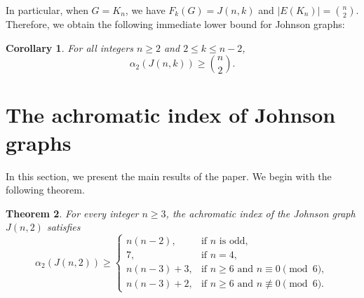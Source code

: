 \documentclass{article}
\newtheorem{theorem}{Theorem}[section]
\newtheorem{corollary}[theorem]{Corollary}
\begin{document}
In particular, when $ G = K_n $, we have $ F_k(G) = J(n,k) $ and $ |E(K_n)| = \binom{n}{2} $. Therefore, we obtain the following immediate lower bound for Johnson graphs:

\begin{corollary}
For all integers $ n \geq 2 $ and $ 2 \leq k \leq n-2 $,
$$
\alpha_2(J(n,k)) \geq \binom{n}{2}.
$$
\end{corollary}







\section{The achromatic index of Johnson graphs}
\label{sect:results}

In this section, we present the main results of the paper. We begin with the following theorem.

\begin{theorem}\label{lower}
For every integer $n\geq 3$, the achromatic index of the Johnson graph
$J(n,2)$ satisfies
$$
\alpha_2(J(n,2))\geq
\begin{cases}
n(n-2), 
    & \text{if $n$ is odd},\\[1mm]
7, 
    & \text{if $n=4$},\\[1mm]
n(n-3)+3, 
    & \text{if $n\geq 6$ and $n\equiv 0\pmod{6}$},\\[1mm]
n(n-3)+2, 
    & \text{if $n\geq 6$ and $n\not\equiv 0\pmod{6}$}.
\end{cases}
$$
\end{theorem}


        
    
\end{document}
